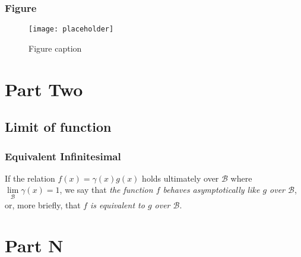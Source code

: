 \documentclass[12pt,fleqn]{book} %
\begin{document}
\section{Figure}

\begin{figure}[h]
\centering\texttt{[image: placeholder]}
\caption{Figure caption}
\end{figure}





\part{Part Two}






\chapter{Limit of function}

\section{Equivalent Infinitesimal}

\begin{definition}
If the relation $f(x)=\gamma(x)g(x)$ holds ultimately over $\mathcal{B}$ where $\lim\limits_{\mathcal{B}}{\gamma(x)}=1$, we say that \emph{the function $f$ behaves asymptotically like $g$ over $\mathcal{B}$}, or, more briefly, that $f$ \emph{is equivalent to $g$ over $\mathcal{B}$}.



\end{definition}


\part{Part N}
\end{document}
